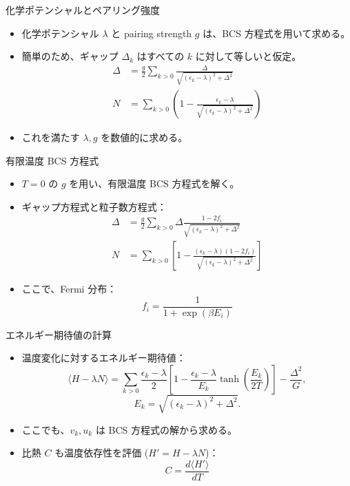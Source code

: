 \documentclass[aspectratio=169, 12pt, dvipdfmx]{beamer}
\begin{document}
\begin{frame}{化学ポテンシャルとペアリング強度}
  \begin{itemize}
    \item 化学ポテンシャル \( \lambda \) と pairing strength \( g \) は、BCS 方程式を用いて求める。
    \item 簡単のため、ギャップ \( \Delta_k \) はすべての \( k \) に対して等しいと仮定。
      \begin{align}
        \Delta  &=  \frac{g}{2} \sum_{k>0} \frac{\Delta}{\sqrt{(\epsilon_k - \lambda)^2 + \Delta^2}} \\
        N  &=  \sum_{k>0} \left(1 - \frac{\epsilon_k - \lambda}{\sqrt{(\epsilon_k - \lambda)^2 + \Delta^2}}\right)
      \end{align}
    \item これを満たす \( \lambda, g \) を数値的に求める。
  \end{itemize}
\end{frame}

\begin{frame}{有限温度 BCS 方程式}
  \begin{itemize}
    \item \( T=0 \) の \( g \) を用い、有限温度 BCS 方程式を解く。
    \item ギャップ方程式と粒子数方程式：
      \begin{align}
        \Delta  &=  \frac{g}{2} \sum_{k>0} \Delta\frac{1 - 2 f_i}{\sqrt{(\epsilon_k - \lambda)^2 + \Delta^2}} \\
        N  &=  \sum_{k>0} \left[1 - \frac{(\epsilon_k - \lambda)(1 - 2 f_i)}{\sqrt{(\epsilon_k - \lambda)^2 + \Delta^2}}\right] 
      \end{align}
    \item ここで、Fermi 分布：
      \[
      f_i = \frac{1}{1 + \exp(\beta E_i)}
      \]
  \end{itemize}
\end{frame}

\begin{frame}{エネルギー期待値の計算}
  \begin{itemize}
    \item 温度変化に対するエネルギー期待値：
      \[
      \langle H -\lambda N\rangle = \sum_{k>0} \frac{\epsilon_k - \lambda}{2}\left[
        1 - \frac{\epsilon_k - \lambda}{E_k}\tanh\left(\frac{E_k}{2T}\right)
        \right] - \frac{\Delta^2}{G},
      \]
      \[
        E_k = \sqrt{(\epsilon_k - \lambda)^2 + \Delta^2}.
      \]
    \item ここでも、\( v_k, u_k \) は BCS 方程式の解から求める。
    \item 比熱 \( C \) も温度依存性を評価  (\(H'=H -\lambda N\))：
      \[
      C = \frac{d\langle H' \rangle}{dT}
      \]
  \end{itemize}
\end{frame}
\end{document}
